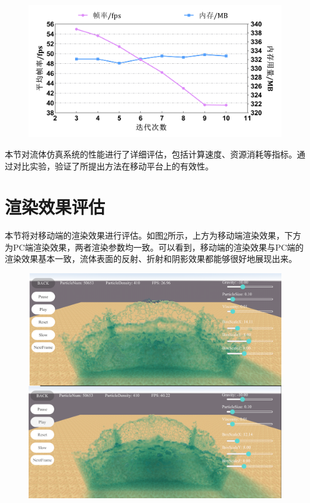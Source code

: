 \begin{figure}[H]
    \centering
    \includegraphics[width=12cm]{image/iteration.png}
    \label{fig:simResult2}
\end{figure}


本节对流体仿真系统的性能进行了详细评估，包括计算速度、资源消耗等指标。通过对比实验，验证了所提出方法在移动平台上的有效性。


\section{渲染效果评估}

本节将对移动端的渲染效果进行评估。如图\ref{fig:compare4}所示，上方为移动端渲染效果，下方为PC端渲染效果，两者渲染参数均一致。可以看到，移动端的渲染效果与PC端的渲染效果基本一致，流体表面的反射、折射和阴影效果都能够很好地展现出来。

\begin{figure}[H]
    \centering
    \includegraphics[width=0.9\linewidth]{image/compare4.png}
    \label{fig:compare4}
\end{figure}



